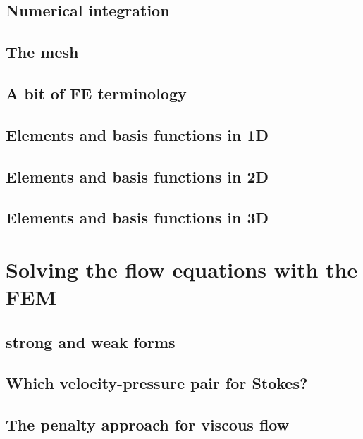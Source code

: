 \documentclass[a4paper]{article}
\begin{document}
\subsection{Numerical integration}  %
\subsection{The mesh}
\subsection{A bit of FE terminology}  %
\subsection{Elements and basis functions in 1D}  %
\subsection{Elements and basis functions in 2D}  %
\subsection{Elements and basis functions in 3D}  %

\newpage 
\section{Solving the flow equations with the FEM} %
\subsection{strong and weak forms}  %
\subsection{Which velocity-pressure pair for Stokes?}  %
\subsection{The penalty approach for viscous flow}  %
\end{document}
